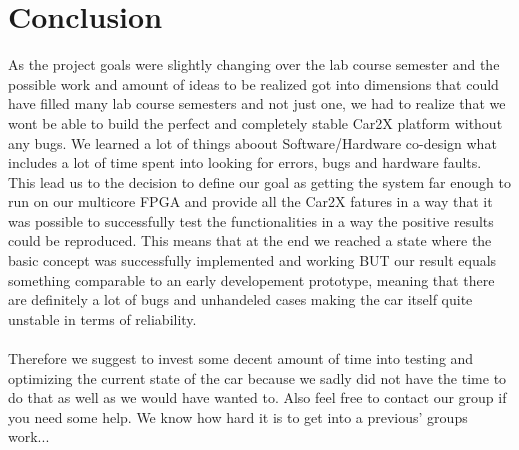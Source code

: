 \chapter{Conclusion}
As the project goals were slightly changing over the lab course semester and the possible work and amount of ideas to be realized got into dimensions that could have filled many lab course semesters and not just one, we had to realize that we wont be able to build the perfect and completely stable Car2X platform without any bugs. We learned a lot of things aboout Software/Hardware co-design what includes a lot of time spent into looking for errors, bugs and hardware faults. This lead us to the decision to define our goal as getting the system far enough to run on our multicore FPGA and provide all the Car2X fatures in a way that it was possible to successfully test the functionalities in a way the positive results could be reproduced. This means that at the end we reached a state where the basic concept was successfully implemented and working BUT our result equals something comparable to an early developement prototype, meaning that there are definitely a lot of bugs and unhandeled cases making the car itself quite unstable in terms of reliability.\\ \\
Therefore we suggest to invest some decent amount of time into testing and optimizing the current state of the car because we sadly did not have the time to do that as well as we would have wanted to.
Also feel free to contact our group if you need some help. We know how hard it is to get into a previous' groups work...
